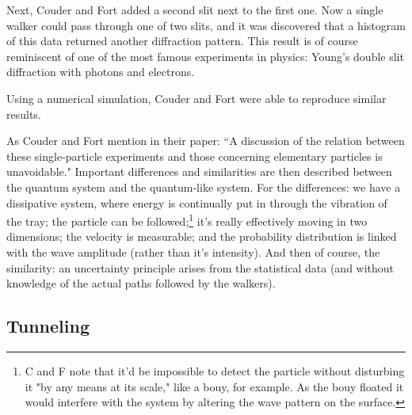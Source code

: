 Next, Couder and Fort added a second slit next to the first one. Now a single walker could pass through  one of two slits, and it was discovered that a histogram of this data returned another diffraction pattern. This result is of course reminiscent of one of the most famous experiments in physics: Young's double slit diffraction with photons and electrons. 
    
Using a numerical simulation, Couder and Fort were able to reproduce similar results. 
    
As Couder and Fort mention in their paper: ``A discussion of the relation between these single-particle experiments and those concerning elementary particles is unavoidable." Important differences and similarities are then described between the quantum system and the quantum-like system. For the differences: we have a dissipative system, where energy is continually put in through the vibration of the tray; the particle can be followed;\footnote{C and F note that it'd be impossible to detect the particle without disturbing it "by any means at its scale," like a bouy, for example. As the bouy floated it would interfere with the system by altering the wave pattern on the surface.} it's really effectively moving in two dimensions; the velocity is measurable; and the probability distribution is linked with the wave amplitude (rather than it's intensity). And then of course, the similarity: an uncertainty principle arises from the statistical data (and without knowledge of the actual paths followed by the walkers). %



\subsection{Tunneling}

